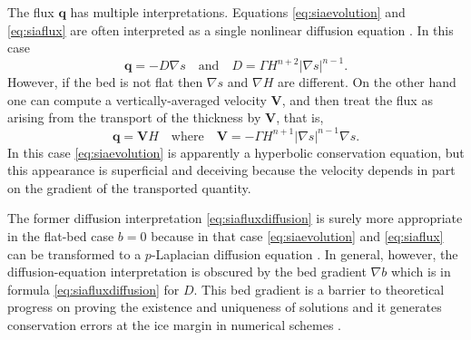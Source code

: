 \documentclass[twocolumn,letterpaper]{igs}
\newcommand\bq{\mathbf{q}}
\newcommand\bV{\mathbf{V}}
\newcommand{\grad}{\nabla}
\begin{document}
The flux $\bq$ has multiple interpretations.  Equations \eqref{eq:siaevolution} and \eqref{eq:siaflux} are often interpreted as a single nonlinear diffusion equation \cite{Huybrechtsetal1996}.  In this case
\begin{equation}
\bq = - D \grad s \quad \text{and} \quad D =  \Gamma H^{n+2} |\grad s|^{n-1}. \label{eq:siafluxdiffusion}
\end{equation}
However, if the bed is not flat then $\grad s$ and $\grad H$ are different.  On the other hand one can compute a vertically-averaged velocity $\bV$, and then treat the flux as arising from the transport of the thickness by $\bV$, that is,
\begin{equation}
\bq = \bV H \quad \text{where} \quad \bV = - \Gamma H^{n+1} |\grad s|^{n-1} \grad s. \label{eq:siafluxvelocity}
\end{equation}
In this case \eqref{eq:siaevolution} is apparently a hyperbolic conservation equation, but this appearance is superficial and deceiving because the velocity depends in part on the gradient of the transported quantity.

The former diffusion interpretation \eqref{eq:siafluxdiffusion} is surely more appropriate in the flat-bed case $b=0$ because in that case \eqref{eq:siaevolution} and \eqref{eq:siaflux} can be transformed to a $p$-Laplacian diffusion equation \citep{Calvoetal2002}.  In general, however, the diffusion-equation interpretation is obscured by the bed gradient $\grad b$ which is in formula \eqref{eq:siafluxdiffusion} for $D$.  This bed gradient is a barrier to theoretical progress on proving the existence and uniqueness of solutions \citep{JouvetBueler2012} and it generates conservation errors at the ice margin in numerical schemes \citep{JaroschSchoofAnslow2013}.
\end{document}
